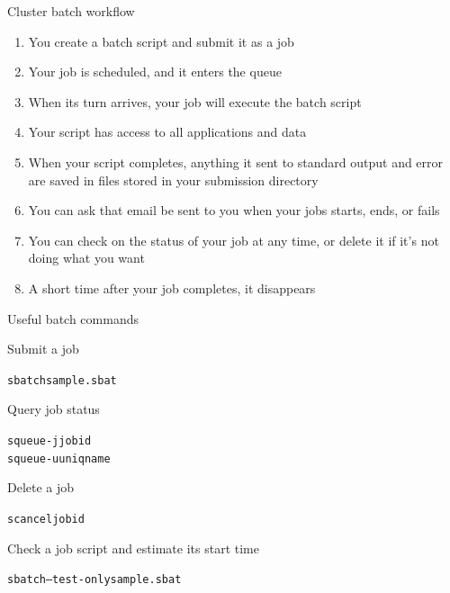 \begin{frame}{Cluster batch workflow}

\begin{enumerate}
\item You create a batch script and submit it as a job
\item Your job is scheduled, and it enters the queue
\item When its turn arrives, your job will execute the batch script
\item Your script has access to all applications and data
\item When your script completes, anything it sent to standard output
and error are saved in files stored in your submission directory
\item You can ask that email be sent to you when your jobs starts, ends,
or fails
\item You can check on the status of your job at any time,
or delete it if it's not doing what you want
\item A short time after your job completes, it disappears
\end{enumerate}
\end{frame}

\begin{frame}{Useful batch commands}

Submit a job
\begin{knitrout}\small
{}\color{fgcolor}\begin{kframe}
\begin{alltt}
sbatch sample.sbat
\end{alltt}
\end{kframe}
\end{knitrout}

Query job status
\begin{knitrout}\small
{}\color{fgcolor}\begin{kframe}
\begin{alltt}
squeue -j jobid
squeue -u uniqname
\end{alltt}
\end{kframe}
\end{knitrout}
Delete a job
\begin{knitrout}\small
{}\color{fgcolor}\begin{kframe}
\begin{alltt}
scancel jobid
\end{alltt}
\end{kframe}
\end{knitrout}
Check a job script and estimate its start time
\begin{knitrout}\small
{}\color{fgcolor}\begin{kframe}
\begin{alltt}
sbatch --test-only sample.sbat
\end{alltt}
\end{kframe}
\end{knitrout}
\end{frame}

